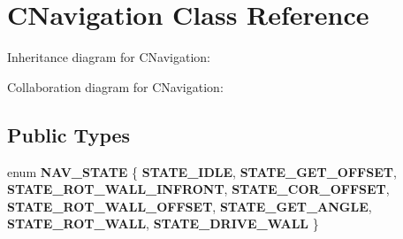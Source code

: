 \hypertarget{class_c_navigation}{}\section{C\+Navigation Class Reference}
\label{class_c_navigation}


Inheritance diagram for C\+Navigation\+:


Collaboration diagram for C\+Navigation\+:
\subsection*{Public Types}
\begin{DoxyCompactItemize}
\item 
\mbox{\label{class_c_navigation_add9fc966c7604990edf5c2a2e0eba32c}} 
enum {\bfseries N\+A\+V\+\_\+\+S\+T\+A\+TE} \{ \newline
{\bfseries S\+T\+A\+T\+E\+\_\+\+I\+D\+LE}, 
{\bfseries S\+T\+A\+T\+E\+\_\+\+G\+E\+T\+\_\+\+O\+F\+F\+S\+ET}, 
{\bfseries S\+T\+A\+T\+E\+\_\+\+R\+O\+T\+\_\+\+W\+A\+L\+L\+\_\+\+I\+N\+F\+R\+O\+NT}, 
{\bfseries S\+T\+A\+T\+E\+\_\+\+C\+O\+R\+\_\+\+O\+F\+F\+S\+ET}, 
\newline
{\bfseries S\+T\+A\+T\+E\+\_\+\+R\+O\+T\+\_\+\+W\+A\+L\+L\+\_\+\+O\+F\+F\+S\+ET}, 
{\bfseries S\+T\+A\+T\+E\+\_\+\+G\+E\+T\+\_\+\+A\+N\+G\+LE}, 
{\bfseries S\+T\+A\+T\+E\+\_\+\+R\+O\+T\+\_\+\+W\+A\+LL}, 
{\bfseries S\+T\+A\+T\+E\+\_\+\+D\+R\+I\+V\+E\+\_\+\+W\+A\+LL}
 \}
\end{DoxyCompactItemize}
